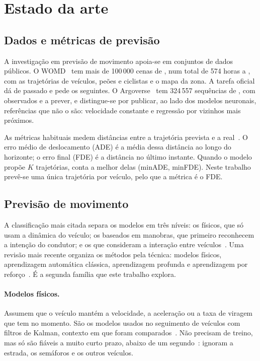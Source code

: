 \section{Estado da arte}
\label{sec:estado-arte}

\subsection{Dados e métricas de previsão}
\label{sec:dados-metricas}

A investigação em previsão de movimento apoia-se em conjuntos de dados
públicos. O WOMD~\cite{ettinger2021large} tem mais de 100\,000 cenas de
, num total de 574 horas a , com as trajetórias de
veículos, peões e ciclistas e o mapa da zona. A tarefa oficial dá
 de passado e pede os  seguintes. O
Argoverse~\cite{chang2019argoverse} tem 324\,557 sequências de ,
com  observados e  a prever, e distingue-se por
publicar, ao lado dos modelos neuronais, referências que não o são:
velocidade constante e regressão por vizinhos mais próximos.

As métricas habituais medem distâncias entre a trajetória prevista e a
real~\cite{chang2019argoverse,ettinger2021large}. O erro médio de
deslocamento (ADE) é a média dessa distância ao longo do horizonte; o
erro final (FDE) é a distância no último instante. Quando o modelo propõe
$K$ trajetórias, conta a melhor delas (minADE, minFDE). Neste trabalho
prevê-se uma única trajetória por veículo, pelo que a métrica é o FDE.

\subsection{Previsão de movimento}
\label{sec:previsao}

A classificação mais citada separa os modelos em três níveis: os físicos,
que só usam a dinâmica do veículo; os baseados em manobras, que primeiro
reconhecem a intenção do condutor; e os que consideram a interação entre
veículos~\cite{lefevre2014survey}. Uma revisão mais recente organiza os
métodos pela técnica: modelos físicos, aprendizagem automática clássica,
aprendizagem profunda e aprendizagem por
reforço~\cite{huang2022survey}. É a segunda família que este trabalho
explora.

\paragraph{Modelos físicos.}
Assumem que o veículo mantém a velocidade, a aceleração ou a taxa de
viragem que tem no momento. São os modelos usados no seguimento de
veículos com filtros de Kalman, contexto em que foram
comparados~\cite{schubert2008comparison}. Não precisam de treino,
mas só são fiáveis a muito curto prazo, abaixo de um
segundo~\cite{lefevre2014survey}: ignoram a estrada, os semáforos e os
outros veículos.

